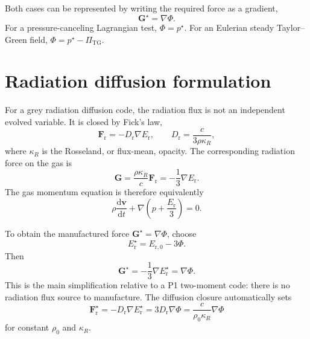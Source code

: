 \documentclass[11pt]{article}
\newcommand{\dd}{\mathrm{d}}
\newcommand{\Grad}{\nabla}
\newcommand{\Er}{E_{\mathrm r}}
\newcommand{\Fr}{\bm{F}_{\mathrm r}}
\newcommand{\Gmom}{\bm{G}}
\newcommand{\Erzero}{E_{\mathrm r,0}}
\newcommand{\Ddiff}{D_{\mathrm r}}
\begin{document}
Both cases can be represented by writing the required force as a gradient,
\begin{equation}
  \Gmom^\star = \Grad\Phi.
  \label{eq:force-potential}
\end{equation}
For a pressure-canceling Lagrangian test, \(\Phi=p^\star\).  For an Eulerian
steady Taylor--Green field, \(\Phi=p^\star-\Pi_{\mathrm{TG}}\).

\section{Radiation diffusion formulation}

For a grey radiation diffusion code, the radiation flux is not an independent
evolved variable.  It is closed by Fick's law,
\begin{equation}
  \Fr = -\Ddiff \Grad \Er,
  \qquad
  \Ddiff = \frac{c}{3\rho\kappa_R},
  \label{eq:diffusion-flux}
\end{equation}
where \(\kappa_R\) is the Rosseland, or flux-mean, opacity.  The corresponding
radiation force on the gas is
\begin{equation}
  \Gmom = \frac{\rho\kappa_R}{c}\Fr
  = -\frac{1}{3}\Grad\Er.
  \label{eq:diffusion-force}
\end{equation}
The gas momentum equation is therefore equivalently
\begin{equation}
  \rho\frac{\dd\bm{v}}{\dd t} + \Grad\left(p+\frac{\Er}{3}\right)=0.
  \label{eq:diffusion-momentum}
\end{equation}

To obtain the manufactured force \(\Gmom^\star=\Grad\Phi\), choose
\begin{equation}
  \boxed{\Er^\star = \Erzero - 3\Phi.}
  \label{eq:diffusion-erad-choice}
\end{equation}
Then
\begin{equation}
  \Gmom^\star
  =
  -\frac{1}{3}\Grad\Er^\star
  =
  \Grad\Phi.
  \label{eq:diffusion-force-choice}
\end{equation}
This is the main simplification relative to a P1 two-moment code: there is no
radiation flux source to manufacture.  The diffusion closure automatically
sets
\begin{equation}
  \Fr^\star
  =
  -\Ddiff\Grad\Er^\star
  =
  3\Ddiff\Grad\Phi
  =
  \frac{c}{\rho_0\kappa_R}\Grad\Phi
  \label{eq:diffusion-flux-choice}
\end{equation}
for constant \(\rho_0\) and \(\kappa_R\).
\end{document}
